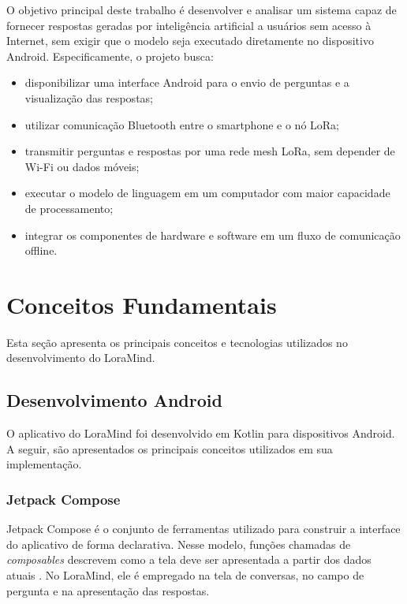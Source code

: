 \documentclass[12pt]{article}
\begin{document}
O objetivo principal deste trabalho é desenvolver e analisar um sistema capaz de fornecer respostas geradas por inteligência artificial a usuários sem acesso à Internet, sem exigir que o modelo seja executado diretamente no dispositivo Android. Especificamente, o projeto busca:

\begin{itemize}
  \item disponibilizar uma interface Android para o envio de perguntas e a visualização das respostas;
  \item utilizar comunicação Bluetooth entre o smartphone e o nó LoRa;
  \item transmitir perguntas e respostas por uma rede mesh LoRa, sem depender de Wi-Fi ou dados móveis;
  \item executar o modelo de linguagem em um computador com maior capacidade de processamento;
  \item integrar os componentes de hardware e software em um fluxo de comunicação offline.
\end{itemize}

\section{Conceitos Fundamentais}
\label{sec:conceitos-fundamentais}

Esta seção apresenta os principais conceitos e tecnologias utilizados no desenvolvimento do LoraMind.

\subsection{Desenvolvimento Android}
\label{subsec:desenvolvimento-android}

O aplicativo do LoraMind foi desenvolvido em Kotlin para dispositivos Android. A seguir, são apresentados os principais conceitos utilizados em sua implementação.

\subsubsection{Jetpack Compose}

Jetpack Compose é o conjunto de ferramentas utilizado para construir a interface do aplicativo de forma declarativa. Nesse modelo, funções chamadas de \textit{composables} descrevem como a tela deve ser apresentada a partir dos dados atuais \cite{androidcomposestate2026}. No LoraMind, ele é empregado na tela de conversas, no campo de pergunta e na apresentação das respostas.
\end{document}
